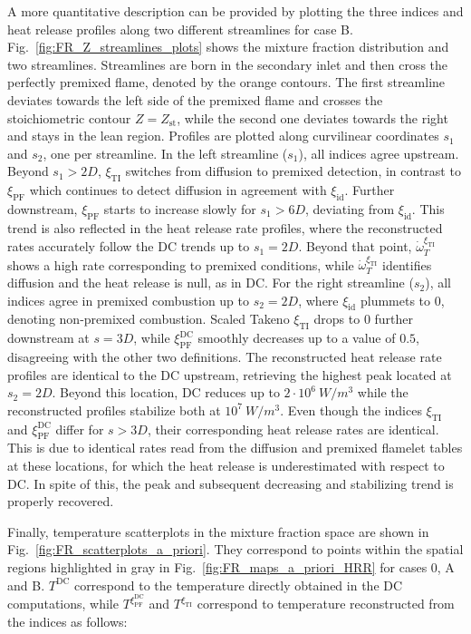 \documentclass[preprint,12pt,authoryear]{elsarticle}
\begin{document}
{A more quantitative description can be provided by plotting the three indices and heat release profiles along two different streamlines for case B. Fig.~\ref{fig:FR_Z_streamlines_plots} shows the mixture fraction distribution and two streamlines. Streamlines are born in the secondary inlet and then cross the perfectly premixed flame, denoted by the orange contours. The first streamline deviates towards the left side of the premixed flame and crosses the stoichiometric contour $Z = Z_\mathrm{st}$, while the second one deviates towards the right and stays in the lean region. Profiles are plotted along curvilinear coordinates $s_1$ and $s_2$, one per streamline. In the left streamline ($s_1$), all indices agree upstream. Beyond $s_1 > 2 D$, $\xi_\mathrm{TI}$ switches from diffusion to premixed detection, in contrast to $\xi_\mathrm{PF}$ which continues to detect diffusion in agreement with $\xi_\mathrm{id}$. Further downstream, $\xi_\mathrm{PF}$ starts to increase slowly for $s_1 > 6 D$, deviating from $\xi_\mathrm{id}$. This trend is also reflected in the heat release rate profiles, where the reconstructed rates accurately follow the DC trends up to $s_1 = 2 D$. Beyond that point, $\dot{\omega}_T^{\xi_\mathrm{TI}}$ shows a high rate corresponding to premixed conditions, while $\dot{\omega}_T^{\xi_\mathrm{TI}}$ identifies diffusion and the heat release is null, as in DC. For the right streamline ($s_2$), all indices agree in premixed combustion up to $s_2 = 2D$, where $\xi_\mathrm{id}$ plummets to 0, denoting non-premixed combustion. Scaled Takeno $\xi_\mathrm{TI}$ drops to $0$ further downstream at $s = 3D$, while $\xi_\mathrm{PF}^\mathrm{DC}$ smoothly decreases up to a value of $0.5$, disagreeing with the other two definitions. The reconstructed heat release rate profiles are identical to the DC upstream, retrieving the highest peak located at $s_2 = 2D$. Beyond this location, DC reduces up to $2 \cdot 10^6 ~ W/m^3$ while the reconstructed profiles stabilize both at $10^7 ~ W/m^3$. Even though the indices $\xi_\mathrm{TI}$ and $\xi_\mathrm{PF}^\mathrm{DC}$ differ for $s > 3D$, their corresponding heat release rates are identical. This is due to identical rates read from the diffusion and premixed flamelet tables at these locations, for which the heat release is underestimated with respect to DC. In spite of this, the peak and subsequent decreasing and stabilizing trend is properly recovered. 

Finally, temperature scatterplots in the mixture fraction space are shown in Fig.~\ref{fig:FR_scatterplots_a_priori}. They correspond to points within the spatial regions highlighted in gray in Fig.~\ref{fig:FR_maps_a_priori_HRR} for cases 0, A and B. $T^\mathrm{DC}$ correspond to the temperature directly obtained in the DC computations, while $T^{\xi_\mathrm{PF}^\mathrm{DC}}$ and $T^{\xi_\mathrm{TI}}$ correspond to temperature reconstructed from the indices as follows:

}
\end{document}
